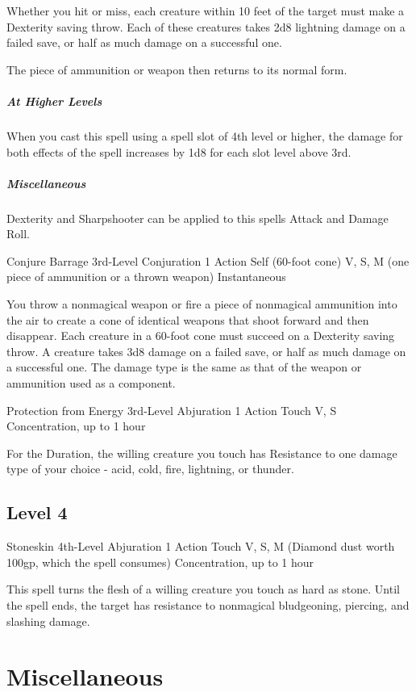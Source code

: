 \documentclass[letterpaper,openany,oneside,twocolumn]{book}
\begin{document}
Whether you hit or miss, each creature within 10 feet of the target must make a Dexterity saving throw. Each of these creatures takes 2d8 lightning damage on a failed save, or half as much damage on a successful one.

The piece of ammunition or weapon then returns to its normal form. 

\subparagraph*{At Higher Levels} When you cast this spell using a spell slot of 4th level or higher, the damage for both effects of the spell increases by 1d8 for each slot level above 3rd.

\subparagraph*{Miscellaneous} Dexterity and Sharpshooter can be applied to this spells Attack and Damage Roll.

\DndSpellHeader
  {Conjure Barrage}
  {3rd-Level Conjuration}
  {1 Action}
  {Self (60-foot cone)}
  {V, S, M (one piece of ammunition or a thrown weapon)}
  {Instantaneous}

You throw a nonmagical weapon or fire a piece of nonmagical ammunition into the air to create a cone of identical weapons that shoot forward and then disappear. Each creature in a 60-foot cone must succeed on a Dexterity saving throw. A creature takes 3d8 damage on a failed save, or half as much damage on a successful one. The damage type is the same as that of the weapon or ammunition used as a component.

\DndSpellHeader
  {Protection from Energy}
  {3rd-Level Abjuration}
  {1 Action}
  {Touch}
  {V, S}
  {Concentration, up to 1 hour}
  
For the Duration, the willing creature you touch has Resistance to one damage type of your choice - acid, cold, fire, lightning, or thunder.

\subsection*{Level 4}

\DndSpellHeader
  {Stoneskin}
  {4th-Level Abjuration}
  {1 Action}
  {Touch}
  {V, S, M (Diamond dust worth 100gp, which the spell consumes)}
  {Concentration, up to 1 hour}
  
This spell turns the flesh of a willing creature you touch as hard as stone. Until the spell ends, the target has resistance to nonmagical bludgeoning, piercing, and slashing damage.

\vfill\eject
\section*{Miscellaneous}
\end{document}
